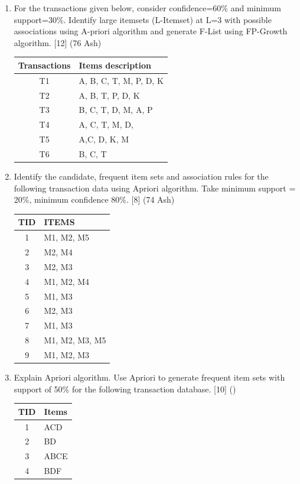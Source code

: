 \documentclass[12pt]{article}
\begin{document}
\begin{enumerate}[topsep=0pt, noitemsep]
      \item For the transactions given below, consider confidence=60\% and minimum support=30\%. Identify large itemsets (L-Itemset) at L=3 with possible associations using A-priori algorithm and generate F-List using FP-Growth algorithm. \hfill [12] (76 Ash)\\
        \small
        \begin{tabular}{|c|l|}
          \hline
          Transactions & Items description \\ \hline
          T1 & A, B, C, T, M, P, D, K \\ \hline
          T2 & A, B, T, P, D, K \\ \hline
          T3 & B, C, T, D, M, A, P \\ \hline
          T4 & A, C, T, M, D, \\ \hline
          T5 & A,C, D, K, M \\ \hline
          T6 & B, C, T \\ \hline
        \end{tabular}
        \normalsize

      \item Identify the candidate, frequent item sets and association rules for the following transaction data using Apriori algorithm. Take minimum support = 20\%, minimum confidence 80\%. \hfill [8] (74 Ash)\\
        \small
        \begin{tabular}{|c|l|}
          \hline
          TID & ITEMS \\ \hline
          1 & M1, M2, M5 \\ \hline
          2 & M2, M4 \\ \hline
          3 & M2, M3 \\ \hline
          4 & M1, M2, M4 \\ \hline
          5 & M1, M3 \\ \hline
          6 & M2, M3 \\ \hline
          7 & M1, M3 \\ \hline
          8 & M1, M2, M3, M5 \\ \hline
          9 & M1, M2, M3 \\ \hline
        \end{tabular}
        \normalsize

      \item Explain Apriori algorithm. Use Apriori to generate frequent item sets with support of 50\% for the following transaction database. \hfill [10] ()\\
        \small
        \begin{tabular}{|c|l|}
          \hline
          TID & Items \\ \hline
          1 & ACD \\ \hline
          2 & BD \\ \hline
          3 & ABCE \\ \hline
          4 & BDF \\ \hline
        \end{tabular}
        \normalsize


\end{enumerate}
\end{document}
